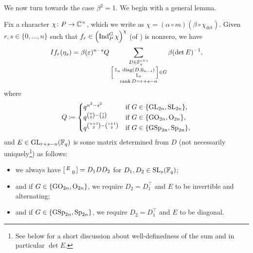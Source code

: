
We now turn towards the case $\beta^2=1$. We begin with a general lemma.
\begin{lemma} \label{lem:matrix-coeff}
	Fix a character $\chi\colon P\to\mathbb C^\times$, which we write as $\chi=(\alpha\circ m)(\beta\circ\chi_{\det})$. Given $r,s\in\{0,\ldots,n\}$ such that $f_r\in\left(\operatorname{Ind}_P^G\chi\right)^\chi$ (of ) is nonzero, we have %
	\[If_r(\eta_s)=\beta(\varepsilon)^{n-s}Q\sum_{\substack{D\in\mathbb F_q^{s\times s}\\\begin{bsmallmatrix}
		1_n & \operatorname{diag}(D,0_{n-s}) \\ & 1_n
	\end{bsmallmatrix}\in G\\\operatorname{rank}D=r+s-n}}\beta(\det E)^{-1},\]
	where
	\[Q\coloneqq\begin{cases}
		q^{n^2-s^2} & \text{if }G\in\{\mathrm{GL}_{2n},\mathrm{SL}_{2n}\}, \\
		q^{\binom{n}2-\binom{s}2} & \text{if }G\in\{\mathrm{GO}_{2n},\mathrm{O}_{2n}\}, \\
		q^{\binom{n+1}2-\binom{s+1}2} & \text{if }G\in\{\mathrm{GSp}_{2n},\mathrm{Sp}_{2n}\},
	\end{cases}\]
	and $E\in\mathrm{GL}_{r+s-n}(\mathbb F_q)$ is some matrix determined from $D$ (not necessarily uniquely\footnote{See  below for a short discussion about well-definedness of the sum and in particular $\det E$.}) as follows:
    \begin{itemize}
        \item we always have $\begin{bsmallmatrix}
    		E \\ & 0
    	\end{bsmallmatrix}=D_1DD_2$ for $D_1,D_2\in\mathrm{SL}_s(\mathbb F_q)$;
        \item and if $G\in\{\mathrm{GO}_{2n},\mathrm{O}_{2n}\}$, we require $D_2=D_1^\intercal$ and $E$ to be invertible and alternating;
        \item and if $G\in\{\mathrm{GSp}_{2n},\mathrm{Sp}_{2n}\}$, we require $D_2=D_1^\intercal$ and $E$ to be diagonal.
    \end{itemize}
\end{lemma}
